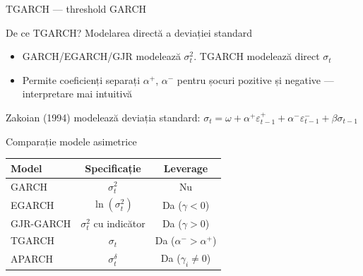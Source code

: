 \documentclass[9pt, aspectratio=169, t]{beamer}
\begin{document}
\begin{frame}{TGARCH --- threshold GARCH}
    \small
    \vspace{-0.2cm}
    \begin{alertblock}{De ce TGARCH? Modelarea directă a deviației standard}
        \begin{itemize}
            \item GARCH/EGARCH/GJR modelează $\sigma_t^2$. TGARCH modelează direct $\sigma_t$
            \item Permite coeficienți separați $\alpha^+$, $\alpha^-$ pentru șocuri pozitive și negative --- interpretare mai intuitivă
        \end{itemize}
    \end{alertblock}
    \vspace{-0.15cm}
    \begin{defn}[TGARCH(1,1)]
        Zakoian (1994) modelează deviația standard:
        $\sigma_t = \omega + \alpha^+ \varepsilon_{t-1}^+ + \alpha^- \varepsilon_{t-1}^- + \beta \sigma_{t-1}$
    \end{defn}

    \vspace{0.2cm}

    \begin{block}{Comparație modele asimetrice}
        \begin{center}
            \small
            \begin{tabular}{lcc}
                \toprule
                \textbf{Model} & \textbf{Specificație} & \textbf{Leverage} \\
                \midrule
                GARCH & $\sigma_t^2$ & Nu \\
                EGARCH & $\ln(\sigma_t^2)$ & Da ($\gamma < 0$) \\
                GJR-GARCH & $\sigma_t^2$ cu indicător & Da ($\gamma > 0$) \\
                TGARCH & $\sigma_t$ & Da ($\alpha^- > \alpha^+$) \\
                APARCH & $\sigma_t^\delta$ & Da ($\gamma_i \neq 0$) \\
                \bottomrule
            \end{tabular}
        \end{center}
    \end{block}
\end{frame}
\end{document}
